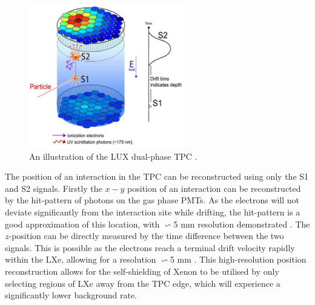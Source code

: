 \begin{figure}
    \centering
    \includegraphics[width=0.6\textwidth]{Figures/LZ/tpc_theory.png}
    \caption{An illustration of the LUX dual-phase TPC \cite{lux_ref}.}
    \label{fig:TPC_theory}
\end{figure}

\par
The position of an interaction in the TPC can be reconstructed using only the S1 and S2 signals.
Firstly the $x-y$ position of an interaction can be reconstructed by the hit-pattern of photons on the gas phase PMTs. 
As the electrons will not deviate significantly from the interaction site while drifting, the hit-pattern is a good approximation of this location, with $\backsim$5 mm resolution demonstrated \cite{lux_position_reconstruction_ref}.
The $z$-position can be directly measured by the time difference between the two signals.
This is possible as the electrons reach a terminal drift velocity rapidly within the LXe, allowing for a resolution $\backsim$5 mm \cite{LZ_TechnicalDesignReview_ref}.
This high-resolution position reconstruction allows for the self-shielding of Xenon to be utilised by only selecting regions of LXe away from the TPC edge, which will experience a significantly lower background rate.

